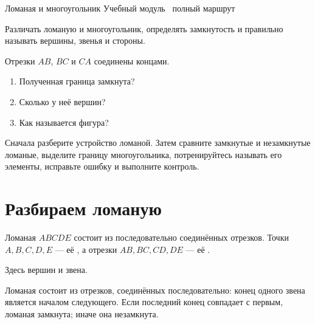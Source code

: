 \worksheettitle
  {Ломаная и многоугольник}
  { Учебный модуль \textbullet\ полный маршрут}

\studentnameblock

\begin{notebox}
  Различать ломаную и многоугольник, определять замкнутость и правильно
  называть вершины, звенья и стороны.
\end{notebox}

\begin{checkpointbox}
  Отрезки $AB$, $BC$ и $CA$ соединены концами.
  \begin{enumerate}[label=\textbf{\arabic*.}]
    \item Полученная граница замкнута? \answerblank[20mm]
    \item Сколько у неё вершин? \answerblank[15mm]
    \item Как называется фигура? \answerblank[30mm]
  \end{enumerate}
\end{checkpointbox}

\begin{notebox}
  Сначала разберите устройство ломаной. Затем сравните замкнутые и
  незамкнутые ломаные, выделите границу многоугольника, потренируйтесь
  называть его элементы, исправьте ошибку и выполните контроль.
\end{notebox}

\section{Разбираем ломаную}

\openbrokenfigure

\begin{fillbox}
  Ломаная $ABCDE$ состоит из последовательно соединённых отрезков.
  Точки $A,B,C,D,E$ --- её \answerblank[25mm], а отрезки
  $AB,BC,CD,DE$ --- её \answerblank[25mm].

  Здесь \answerblank[15mm] вершин и \answerblank[15mm] звена.
\end{fillbox}

\begin{notebox}[Правило]
  Ломаная состоит из отрезков, соединённых последовательно: конец одного
  звена является началом следующего. Если последний конец совпадает с первым,
  ломаная замкнута; иначе она незамкнута.
\end{notebox}

